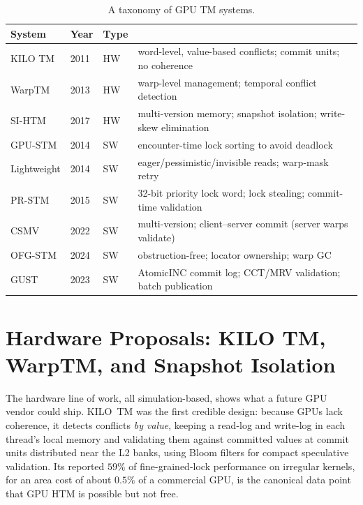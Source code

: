 \begin{table}[ht]
\centering
\begin{tabular}{lllM{9cm}}
\hline
\textbf{System} & \textbf{Year} & \textbf{Type} &  \\
\hline
KILO TM \cite{fung11kilotm} & 2011 & HW & word-level, value-based conflicts; commit units; no coherence \\
WarpTM \cite{fung13warptm} & 2013 & HW & warp-level management; temporal conflict detection \\
SI-HTM \cite{chen17snapshot} & 2017 & HW & multi-version memory; snapshot isolation; write-skew elimination \\
GPU-STM \cite{xu14gpustm} & 2014 & SW & encounter-time lock sorting to avoid deadlock \\
Lightweight \cite{holey14} & 2014 & SW & eager/pessimistic/invisible reads; warp-mask retry \\
PR-STM \cite{shen15prstm} & 2015 & SW & 32-bit priority lock word; lock stealing; commit-time validation \\
CSMV \cite{nunes22csmv} & 2022 & SW & multi-version; client--server commit (server warps validate) \\
OFG-STM \cite{perlin24ofg} & 2024 & SW & obstruction-free; locator ownership; warp GC \\
GUST \cite{nunes23gust} & 2023 & SW & AtomicINC commit log; CCT/MRV validation; batch publication \\
\hline
\end{tabular}
\caption{A taxonomy of GPU TM systems.}
\label{tab:gpu-tm}
\end{table}

\section{Hardware Proposals: KILO TM, WarpTM, and Snapshot Isolation}
\label{sec:hardware}

The hardware line of work, all simulation-based, shows what a future GPU
vendor could ship. KILO~TM \cite{fung11kilotm} was the first credible design:
because GPUs lack coherence, it detects conflicts \emph{by value}, keeping a
read-log and write-log in each thread's local memory and validating them
against committed values at commit units distributed near the L2 banks, using
Bloom filters for compact speculative validation. Its reported $59\%$ of
fine-grained-lock performance on irregular kernels, for an area cost of about
$0.5\%$ of a commercial GPU, is the canonical data point that GPU HTM is
possible but not free.


